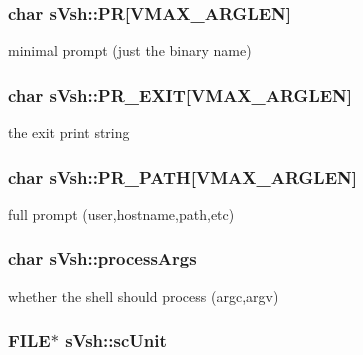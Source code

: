 \subsubsection[{P\-R}]{\setlength{\rightskip}{0pt plus 5cm}char s\-Vsh\-::\-P\-R[{\bf V\-M\-A\-X\-\_\-\-A\-R\-G\-L\-E\-N}]}\label{a00007_ad8d9d3a62f8a4a3cb4378aa58df6c976}


minimal prompt (just the binary name) 

\subsubsection[{P\-R\-\_\-\-E\-X\-I\-T}]{\setlength{\rightskip}{0pt plus 5cm}char s\-Vsh\-::\-P\-R\-\_\-\-E\-X\-I\-T[{\bf V\-M\-A\-X\-\_\-\-A\-R\-G\-L\-E\-N}]}\label{a00007_a5973c822b71c353f131271631bbb43d0}


the exit print string 

\subsubsection[{P\-R\-\_\-\-P\-A\-T\-H}]{\setlength{\rightskip}{0pt plus 5cm}char s\-Vsh\-::\-P\-R\-\_\-\-P\-A\-T\-H[{\bf V\-M\-A\-X\-\_\-\-A\-R\-G\-L\-E\-N}]}\label{a00007_a3d143e1a14f7ccd95292039d17679c17}


full prompt (user,hostname,path,etc) 

\subsubsection[{process\-Args}]{\setlength{\rightskip}{0pt plus 5cm}char s\-Vsh\-::process\-Args}\label{a00007_a4787c933c7915d6c1f8500e8d97abe7c}


whether the shell should process (argc,argv) 

\subsubsection[{sc\-Unit}]{\setlength{\rightskip}{0pt plus 5cm}F\-I\-L\-E$\ast$ s\-Vsh\-::sc\-Unit}\label{a00007_a471927ccabdbbb75601d1d406e8cbc76}


